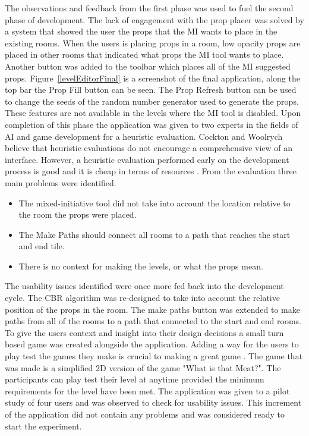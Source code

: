 \documentclass[journal]{IEEEtran}
\begin{document}
The observations and feedback from the first phase was used to fuel the second phase of development. The lack of engagement with the prop placer was solved by a system that showed the user the props that the MI wants to place in the existing rooms. When the users is placing props in a room, low opacity props are placed in other rooms that indicated what props the MI tool wants to place. Another button was added to the toolbar which 
places all of the MI suggested props. Figure~\ref{levelEditorFinal} is a screenshot of the final application, along the top bar the Prop Fill button can be seen. The Prop Refresh button can be used to change the seeds of the random number generator used to generate the props. These features are not available in the levels where the MI tool is disabled. Upon completion of this phase the application was given to two experts in the fields of AI and game development for a heuristic evaluation.  Cockton and Woolrych\cite{cockton2002sale} believe that heuristic evaluations do not encourage a comprehensive view of an interface. However, a heuristic evaluation performed early on the development process is good \cite{nielsen1990heuristic} and it is cheap in terms of resources \cite{nielsen1990heuristic} . From the evaluation three main problems were identified.
\begin{itemize}
\item The mixed-initiative tool did not take into account the location relative to the room the props were placed.
\item The Make Paths should connect all rooms to a path that reaches the start and end tile.
\item There is no context for making the levels, or what the props mean.
\end{itemize}

The usability issues identified were once more fed back into the development cycle. The CBR algorithm was re-designed to take into account the relative position of the props in the room. The make paths button was extended to make paths from all of the rooms to a path that connected to the start and end rooms. To give the users context and insight into their design decisions a small turn based game was created alongside the application. Adding a way for the users to play test the games they make is crucial to making a great game \cite{winn2006resolving}. The game that was made is a simplified  2D version of the game "What is that Meat?". The participants can play test their level at anytime provided the minimum requirements for the level have been met. The application was given to a pilot study of four users and was observed to check for usability issues. This increment of the application did not contain any problems and was considered ready to start the experiment.
\end{document}
